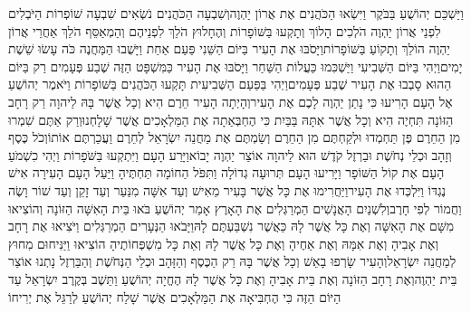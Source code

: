\documentclass[../main/main.tex]{subfiles}
\begin{document}
\begin{multicols*}{\ncols}
וַיַּשְׁכֵּם יְהוֹשֻׁעַ בַּבֹּקֶר וַיִּשְׂאוּ הַכֹּהֲנִים אֶת אֲרוֹן יַהְוֶה\PreVerseSpace{}וְשִׁבְעָה הַכֹּהֲנִים נֹשְׂאִים שִׁבְעָה שׁוֹפְרוֹת הַיֹּבְלִים לִפְנֵי אֲרוֹן יַהְוֶה הֹלְכִים הָלוֹךְ וְתָקְעוּ בַּשּׁוֹפָרוֹת וְהֶחָלוּץ הֹלֵךְ לִפְנֵיהֶם וְהַמְאַסֵּף הֹלֵךְ אַחֲרֵי אֲרוֹן יַהְוֶה הוֹלֵךְ וְתָקוֹעַ בַּשּׁוֹפָרוֹת\PreVerseSpace{}וַיָּסֹבּוּ אֶת הָעִיר בַּיּוֹם הַשֵּׁנִי פַּעַם אַחַת וַיָּשֻׁבוּ הַמַּחֲנֶה כֹּה עָשׂוּ שֵׁשֶׁת יָמִים\PreVerseSpace{}וַיְהִי בַּיּוֹם הַשְּׁבִיעִי וַיַּשְׁכִּמוּ כַּעֲלוֹת הַשַּׁחַר וַיָּסֹבּוּ אֶת הָעִיר כַּמִּשְׁפָּט הַזֶּה שֶׁבַע פְּעָמִים רַק בַּיּוֹם הַהוּא סָבְבוּ אֶת הָעִיר שֶׁבַע פְּעָמִים\PreVerseSpace{}וַיְהִי בַּפַּעַם הַשְּׁבִיעִית תָּקְעוּ הַכֹּהֲנִים בַּשּׁוֹפָרוֹת וַיֹּאמֶר יְהוֹשֻׁעַ אֶל הָעָם הָרִיעוּ כִּי נָתַן יַהְוֶה לָכֶם אֶת הָעִיר\PreVerseSpace{}וְהָיְתָה הָעִיר חֵרֶם הִיא וְכָל אֲשֶׁר בָּהּ לַיהוָה רַק רָחָב הַזּוֹנָה תִּחְיֶה הִיא וְכָל אֲשֶׁר אִתָּהּ בַּבַּיִת כִּי הֶחְבְּאַתָה אֶת הַמַּלְאָכִים אֲשֶׁר שָׁלָחְנוּ\PreVerseSpace{}וְרַק אַתֶּם שִׁמְרוּ מִן הַחֵרֶם פֶּן תַּחְמְדוּ\SubEnd{} וּלְקַחְתֶּם מִן הַחֵרֶם וְשַׂמְתֶּם אֶת מַחֲנֵה יִשְׂרָאֵל לְחֵרֶם וַעֲכַרְתֶּם אוֹתוֹ\PreVerseSpace{}וְכֹל כֶּסֶף וְזָהָב וּכְלֵי נְחֹשֶׁת וּבַרְזֶל קֹדֶשׁ הוּא לַיהוָה אוֹצַר יַהְוֶה יָבוֹא\PreVerseSpace{}וַיָּרַע הָעָם וַיִּתְקְעוּ בַּשֹּׁפָרוֹת וַיְהִי כִשְׁמֹעַ הָעָם אֶת קוֹל הַשּׁוֹפָר וַיָּרִיעוּ הָעָם תְּרוּעָה גְדוֹלָה וַתִּפֹּל הַחוֹמָה תַּחְתֶּיהָ וַיַּעַל הָעָם הָעִירָה אִישׁ נֶגְדּוֹ וַיִּלְכְּדוּ אֶת הָעִיר\PreVerseSpace{}וַיַּחֲרִימוּ אֶת כָּל אֲשֶׁר בָּעִיר מֵאִישׁ וְעַד אִשָּׁה מִנַּעַר וְעַד זָקֵן וְעַד שׁוֹר וָשֶׂה וַחֲמוֹר לְפִי חָרֶב\PreVerseSpace{}וְלִשְׁנַיִם הָאֲנָשִׁים הַמְרַגְּלִים אֶת הָאָרֶץ אָמַר יְהוֹשֻׁעַ בֹּאוּ בֵּית הָאִשָּׁה הַזּוֹנָה וְהוֹצִיאוּ מִשָּׁם אֶת הָאִשָּׁה וְאֶת כָּל אֲשֶׁר לָהּ כַּאֲשֶׁר נִשְׁבַּעְתֶּם לָהּ\PreVerseSpace{}וַיָּבֹאוּ הַנְּעָרִים הַמְרַגְּלִים וַיֹּצִיאוּ אֶת רָחָב וְאֶת אָבִיהָ וְאֶת אִמָּהּ וְאֶת אַחֶיהָ וְאֶת כָּל אֲשֶׁר לָהּ וְאֵת כָּל מִשְׁפְּחוֹתֶיהָ הוֹצִיאוּ וַיַּנִּיחוּם מִחוּץ לְמַחֲנֵה יִשְׂרָאֵל\PreVerseSpace{}וְהָעִיר שָׂרְפוּ בָאֵשׁ וְכָל אֲשֶׁר בָּהּ רַק הַכֶּסֶף וְהַזָּהָב וּכְלֵי הַנְּחֹשֶׁת וְהַבַּרְזֶל נָתְנוּ אוֹצַר בֵּית יַהְוֶה\PreVerseSpace{}וְאֶת רָחָב הַזּוֹנָה וְאֶת בֵּית אָבִיהָ וְאֶת כָּל אֲשֶׁר לָהּ הֶחֱיָה יְהוֹשֻׁעַ וַתֵּשֶׁב בְּקֶרֶב יִשְׂרָאֵל עַד הַיּוֹם הַזֶּה כִּי הֶחְבִּיאָה אֶת הַמַּלְאָכִים אֲשֶׁר שָׁלַח יְהוֹשֻׁעַ לְרַגֵּל אֶת יְרִיחוֹ\OpenSection{}\par

\end{multicols*}
\end{document}
